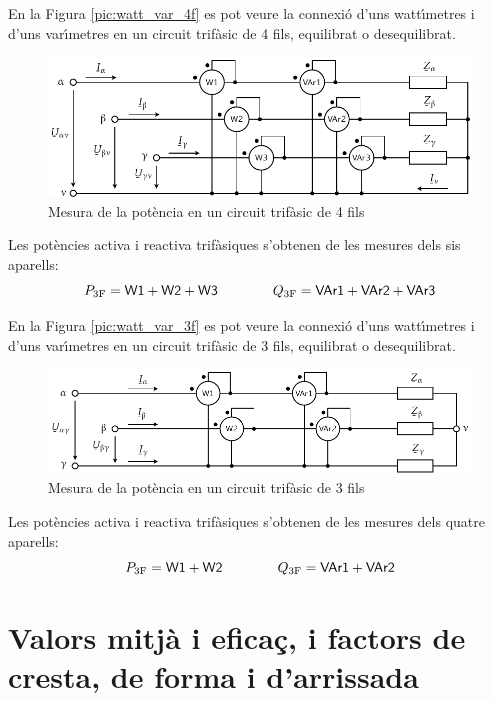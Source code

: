 En la Figura \vref{pic:watt_var_4f} es pot veure la connexi\'{o} d'uns
watt\'{\i}metres i d'uns var\'{\i}metres en un circuit trif\`{a}sic de 4 fils,
equilibrat o desequilibrat.
\begin{figure}[htb]
\centering
    \includegraphics{Imatges/Cap-Fonaments-Mesura-Potencia-Trif-4f.pdf}
\caption{Mesura de la pot\`{e}ncia en un circuit  trif\`{a}sic de 4 fils}
\label{pic:watt_var_4f}
\end{figure}

Les pot\`{e}ncies activa i reactiva trif\`{a}siques s'obtenen de les mesures
dels sis aparells:
\begin{equation}
    P_\mathrm{3F} = \textsf{W1} +  \textsf{W2} + \textsf{W3}
    \qquad\qquad Q_\mathrm{3F} = \textsf{VAr1} +  \textsf{VAr2} + \textsf{VAr3}
\end{equation}

En la Figura \vref{pic:watt_var_3f} es pot veure la connexi\'{o} d'uns
watt\'{\i}metres i d'uns var\'{\i}metres en un circuit trif\`{a}sic de 3 fils,
equilibrat o desequilibrat.
\begin{figure}[htb]
\centering
    \includegraphics{Imatges/Cap-Fonaments-Mesura-Potencia-Trif-3f.pdf}
\caption{Mesura de la pot\`{e}ncia en un circuit  trif\`{a}sic de 3 fils}
\label{pic:watt_var_3f}
\end{figure}

Les pot\`{e}ncies activa i reactiva trif\`{a}siques s'obtenen de les mesures
dels quatre aparells:
\begin{equation}
    P_\mathrm{3F} = \textsf{W1} +  \textsf{W2}
    \qquad\qquad Q_\mathrm{3F} = \textsf{VAr1} +  \textsf{VAr2}
\end{equation}

\section{Valors mitj\`{a} i efica\c{c}, i factors de cresta, de forma i
d'arrissada}\label{sec:val_mitja_ef}

